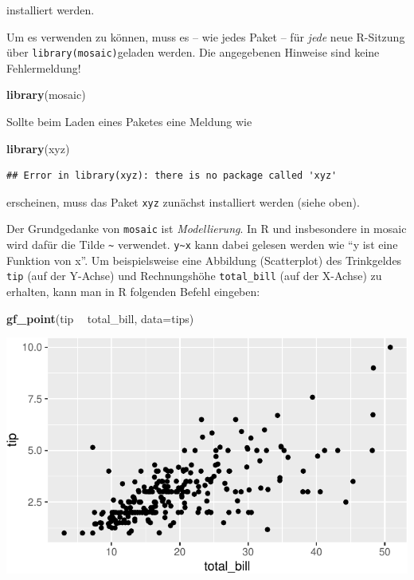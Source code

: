 \documentclass[12pt,ngerman,paper=a4,pagesize,DIV=13]{scrreprt}
\newenvironment{Shaded}{\begin{snugshade}}{\end{snugshade}}
\newcommand{\DataTypeTok}[1]{\textcolor[rgb]{0.13,0.29,0.53}{#1}}
\newcommand{\KeywordTok}[1]{\textcolor[rgb]{0.13,0.29,0.53}{\textbf{#1}}}
\newcommand{\NormalTok}[1]{#1}
\newcommand{\OperatorTok}[1]{\textcolor[rgb]{0.81,0.36,0.00}{\textbf{#1}}}
\newcommand{\StringTok}[1]{\textcolor[rgb]{0.31,0.60,0.02}{#1}}
\begin{document}
installiert werden.

Um es verwenden zu können, muss es -- wie jedes Paket -- für \emph{jede}
neue R-Sitzung über \texttt{library(mosaic)}geladen werden. Die
angegebenen Hinweise sind keine Fehlermeldung!

\begin{Shaded}
\begin{Highlighting}[]
\KeywordTok{library}\NormalTok{(mosaic)}
\end{Highlighting}
\end{Shaded}

Sollte beim Laden eines Paketes eine Meldung wie

\begin{Shaded}
\begin{Highlighting}[]
\KeywordTok{library}\NormalTok{(xyz)}
\end{Highlighting}
\end{Shaded}

\begin{verbatim}
## Error in library(xyz): there is no package called 'xyz'
\end{verbatim}

erscheinen, muss das Paket \texttt{xyz} zunächst installiert werden
(siehe oben).

Der Grundgedanke von \texttt{mosaic} ist \emph{Modellierung}. In R und
insbesondere in mosaic wird dafür die Tilde \texttt{\textasciitilde{}}
verwendet. \texttt{y\textasciitilde{}x} kann dabei gelesen werden wie
\enquote{y ist eine Funktion von x}. Um beispielsweise eine Abbildung
(Scatterplot) des Trinkgeldes \texttt{tip} (auf der Y-Achse) und
Rechnungshöhe \texttt{total\_bill} (auf der X-Achse) zu erhalten, kann
man in R folgenden Befehl eingeben:

\begin{Shaded}
\begin{Highlighting}[]
\KeywordTok{gf_point}\NormalTok{(tip }\OperatorTok{~}\StringTok{ }\NormalTok{total_bill, }\DataTypeTok{data=}\NormalTok{tips)}
\end{Highlighting}
\end{Shaded}

\includegraphics{DatenerhebungStatistik-Uebung_files/figure-latex/unnamed-chunk-28-1.pdf}
\end{document}
